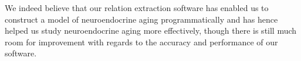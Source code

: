 We indeed believe that our relation extraction software has enabled us to construct a
model of neuroendocrine aging programmatically and has hence helped us study
neuroendocrine aging more effectively, though there is still much room for improvement
with regards to the accuracy and performance of our software.
